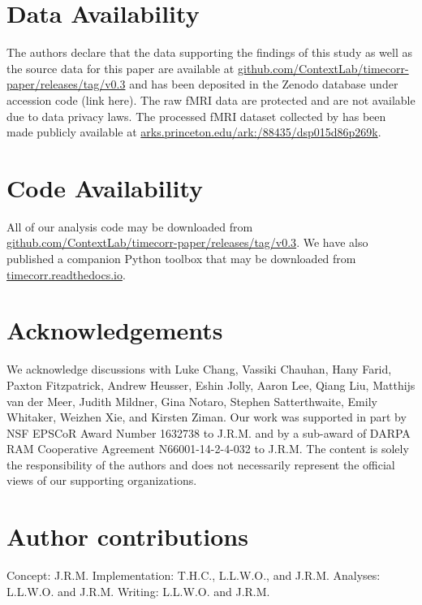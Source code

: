 \documentclass[english]{article}
\begin{document}
\section*{Data Availability}

The authors declare that the data supporting the findings of this
study as well as the source data for this paper are available at
\href{https://github.com/ContextLab/timecorr-paper/releases/tag/v0.3}{github.com/ContextLab/timecorr-paper/releases/tag/v0.3}
and has been deposited in the Zenodo database under accession code
(link here).
The raw fMRI data are protected and are not available due to data
privacy laws. The processed fMRI dataset collected by
\cite{SimoEtal16} has been made publicly available \cite{SimoEtal16b} at
\href{http://arks.princeton.edu/ark:/88435/dsp015d86p269k}{arks.princeton.edu/ark:/88435/dsp015d86p269k}. 

\section*{Code Availability}

All of our analysis code may be downloaded from
\href{https://github.com/ContextLab/timecorr-paper/releases/tag/v0.3}{github.com/ContextLab/timecorr-paper/releases/tag/v0.3}. We have also published a companion Python toolbox that may be downloaded from \href{https://timecorr.readthedocs.io}{timecorr.readthedocs.io}.


\section*{Acknowledgements}
We acknowledge discussions with Luke Chang, Vassiki Chauhan, Hany
Farid, Paxton Fitzpatrick, Andrew Heusser, Eshin Jolly, Aaron Lee,
Qiang Liu, Matthijs van der Meer, Judith Mildner, Gina Notaro, Stephen
Satterthwaite, Emily Whitaker, Weizhen Xie, and Kirsten Ziman. Our
work was supported in part by NSF EPSCoR Award Number 1632738 to
J.R.M. and by a sub-award of DARPA RAM Cooperative Agreement
N66001-14-2-4-032 to J.R.M.  The content is solely the responsibility
of the authors and does not necessarily represent the official views
of our supporting organizations.

\section*{Author contributions}
Concept: J.R.M.  Implementation: T.H.C., L.L.W.O., and J.R.M.
Analyses: L.L.W.O. and J.R.M.  Writing: L.L.W.O. and J.R.M.
\end{document}
